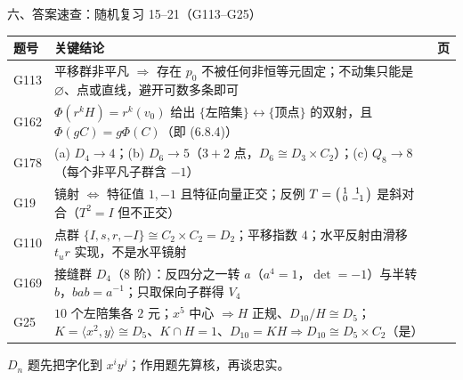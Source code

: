\documentclass[aspectratio=169,10pt,fontset=none]{ctexbeamer}
\begin{document}
\begin{frame}[t]{六、答案速查：随机复习 15--21（G113--G25）}
  \centering
  \scriptsize
  \setlength{\tabcolsep}{3pt}
  \renewcommand{\arraystretch}{1.14}
  \begin{tabular}{@{}l p{9.9cm} c@{}}
    \toprule
    题号 & 关键结论 & 页\\
    \midrule
    G113 & 平移群非平凡 $\Rightarrow$ 存在 $p_0$ 不被任何非恒等元固定；不动集只能是 $\varnothing$、点或直线，避开可数多条即可 & \pageref{ex:G113}\\
    G162 & $\Phi(r^kH)=r^k(v_0)$ 给出 $\{$左陪集$\}\leftrightarrow\{$顶点$\}$ 的双射，且 $\Phi(gC)=g\Phi(C)$（即 (6.8.4)） & \pageref{ex:G162}\\
    G178 & (a) $D_4\to4$；(b) $D_6\to5$（$3+2$ 点，$D_6\cong D_3\times C_2$）；(c) $Q_8\to8$（每个非平凡子群含 $-1$） & \pageref{ex:G178}\\
    G19 & 镜射 $\iff$ 特征值 $1,-1$ 且特征向量正交；反例 $T=\begin{psmallmatrix}1&1\\0&-1\end{psmallmatrix}$ 是斜对合（$T^2=I$ 但不正交） & \pageref{ex:G19}\\
    G110 & 点群 $\{I,s,r,-I\}\cong C_2\times C_2=D_2$；平移指数 $4$；水平反射由滑移 $t_u r$ 实现，不是水平镜射 & \pageref{ex:G110}\\
    G169 & 接缝群 $D_4$（$8$ 阶）：反四分之一转 $a$（$a^4=1$，$\det=-1$）与半转 $b$，$bab=a^{-1}$；只取保向子群得 $V_4$ & \pageref{ex:G169}\\
    G25 & $10$ 个左陪集各 $2$ 元；$x^5$ 中心 $\Rightarrow H$ 正规、$D_{10}/H\cong D_5$；$K=\langle x^2,y\rangle\cong D_5$、$K\cap H=1$、$D_{10}=KH\Rightarrow D_{10}\cong D_5\times C_2$（是） & \pageref{ex:G25}\\
    \bottomrule
  \end{tabular}
  \par
  \vspace{0.3em}
  {\scriptsize\color{ink!70} $D_n$ 题先把字化到 $x^iy^j$；作用题先算核，再谈忠实。}
\end{frame}
\end{document}
